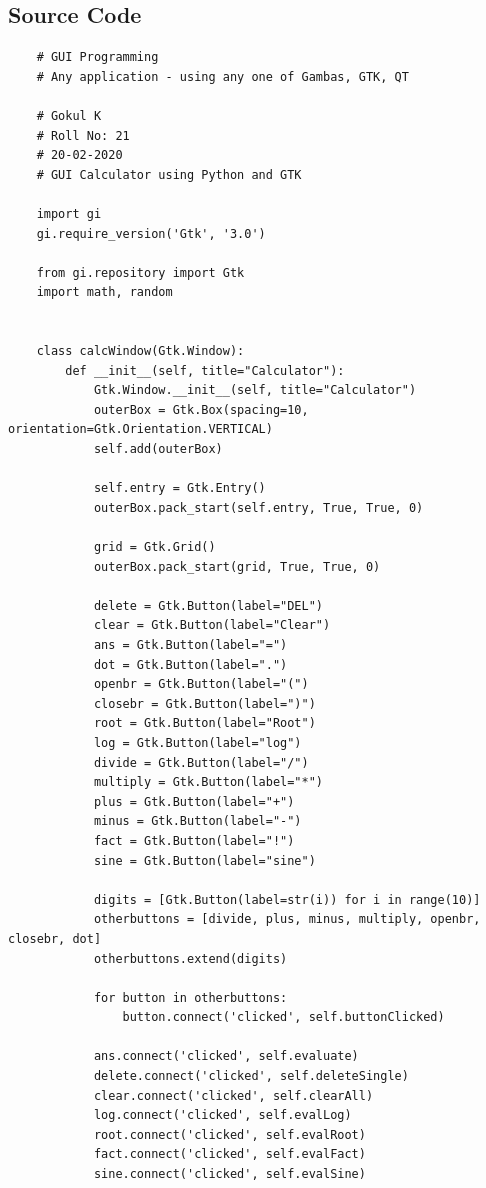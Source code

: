 \documentclass{article}
\begin{document}
\subsection{Source Code}
\begin{verbatim}
    # GUI Programming
    # Any application - using any one of Gambas, GTK, QT

    # Gokul K
    # Roll No: 21
    # 20-02-2020
    # GUI Calculator using Python and GTK
    
    import gi
    gi.require_version('Gtk', '3.0')
    
    from gi.repository import Gtk
    import math, random
    
    
    class calcWindow(Gtk.Window):
        def __init__(self, title="Calculator"):
            Gtk.Window.__init__(self, title="Calculator")
            outerBox = Gtk.Box(spacing=10, orientation=Gtk.Orientation.VERTICAL)
            self.add(outerBox)
    
            self.entry = Gtk.Entry()
            outerBox.pack_start(self.entry, True, True, 0)
    
            grid = Gtk.Grid()
            outerBox.pack_start(grid, True, True, 0)
    
            delete = Gtk.Button(label="DEL")
            clear = Gtk.Button(label="Clear")
            ans = Gtk.Button(label="=")
            dot = Gtk.Button(label=".")
            openbr = Gtk.Button(label="(")
            closebr = Gtk.Button(label=")")
            root = Gtk.Button(label="Root")
            log = Gtk.Button(label="log")
            divide = Gtk.Button(label="/")
            multiply = Gtk.Button(label="*")
            plus = Gtk.Button(label="+")
            minus = Gtk.Button(label="-")
            fact = Gtk.Button(label="!")
            sine = Gtk.Button(label="sine")
    
            digits = [Gtk.Button(label=str(i)) for i in range(10)]
            otherbuttons = [divide, plus, minus, multiply, openbr, closebr, dot]
            otherbuttons.extend(digits)
    
            for button in otherbuttons:
                button.connect('clicked', self.buttonClicked)
    
            ans.connect('clicked', self.evaluate)
            delete.connect('clicked', self.deleteSingle)
            clear.connect('clicked', self.clearAll)
            log.connect('clicked', self.evalLog)
            root.connect('clicked', self.evalRoot)
            fact.connect('clicked', self.evalFact)
            sine.connect('clicked', self.evalSine)
    

\end{verbatim}
\end{document}
